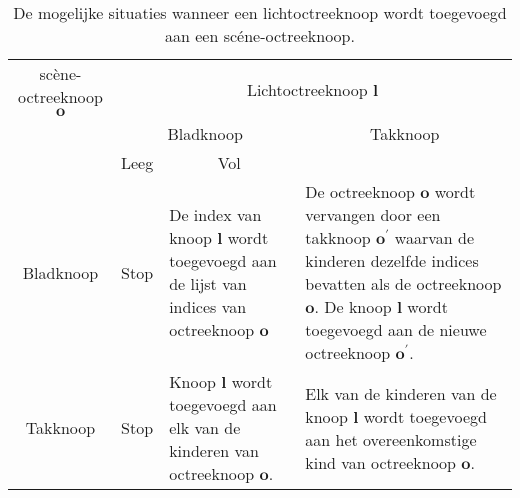 \begin{table}
  \begin{tabularx}{\textwidth}{ccXX}\toprule
    sc\`ene-octreeknoop $\mathbf{o}$ & \multicolumn{3}{c}{Lichtoctreeknoop $\mathbf{l}$}                            \\
                                  & \multicolumn{2}{c}{Bladknoop}                      & \multicolumn{1}{c}{Takknoop} \\
                                  & \multicolumn{1}{c}{Leeg} & \multicolumn{1}{c}{Vol} &                              \\ \midrule
    Bladknoop &
      Stop &
    
      De index van knoop $\mathbf{l}$ wordt toegevoegd aan de lijst van
      indices van octreeknoop $\mathbf{o}$ &

      De octreeknoop $\mathbf{o}$ wordt vervangen door een takknoop
      $\mathbf{o}^\prime$ waarvan de kinderen dezelfde indices bevatten als de
      octreeknoop $\mathbf{o}$. De knoop $\mathbf{l}$ wordt toegevoegd
      aan de nieuwe octreeknoop $\mathbf{o}^\prime$. \\

    Takknoop &
      Stop &

      Knoop $\mathbf{l}$ wordt toegevoegd aan elk van de kinderen van
      octreeknoop $\mathbf{o}$. &

      Elk van de kinderen van de knoop $\mathbf{l}$ wordt toegevoegd aan
      het overeenkomstige kind van octreeknoop $\mathbf{o}$. \\ \bottomrule
  \end{tabularx}
  \caption{De mogelijke situaties wanneer een lichtoctreeknoop wordt
           toegevoegd aan een sc\'ene-octreeknoop.}
  \label{tbl:hs-lichtoctree}
\end{table}
